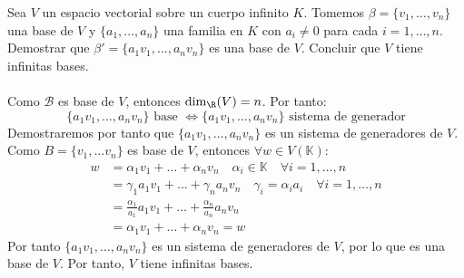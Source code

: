 \begin{ejercicio} Sea \( V \) un espacio vectorial sobre un cuerpo infinito \( K \). Tomemos \( \beta = \{v_1, \ldots, v_n\} \) una base de \( V \) y \( \{a_1, \ldots, a_n\} \) una familia en \( K \) con \( a_i \neq 0 \) para cada \( i = 1, \ldots, n \). Demostrar que \( \beta' = \{a_1v_1, \ldots, a_nv_n\} \) es una base de \( V \). Concluir que \( V \) tiene infinitas bases.
    \\ \\Como $\mathcal{B}$ es base de $V$, entonces $\dim_\R (V) = n$. Por tanto:
    \begin{equation*}
        \{a_1 v_1, \ldots, a_n v_n\} \text{ base } \Leftrightarrow \{a_1 v_1, \ldots, a_n v_n\} \text{ sistema de generador}
    \end{equation*}
    Demostraremos por tanto que $\{a_1 v_1, \ldots, a_n v_n\}$ es un sistema de generadores de $V$. Como
    $B = \{ v_1, \ldots v_n \}$ es base de $V$, entonces $\forall w \in V(\mathbb{K})$:
    \begin{align*}  
        w &= \alpha_1 v_1 + \ldots + \alpha_n v_n \quad \alpha_i \in \mathbb{K} \quad \forall i = 1, \ldots, n \\
        &= \gamma_1 a_1 v_1 + \ldots + \gamma_n a_n v_n \quad \gamma_i = \alpha_i a_i \quad \forall i = 1, \ldots, n \\
        &= \frac{\alpha_1}{a_1} a_1 v_1 + \ldots + \frac{\alpha_n}{a_n} a_n v_n \\
        &= \alpha_1 v_1 + \ldots + \alpha_n v_n = w
    \end{align*}
    Por tanto $\{a_1 v_1, \ldots, a_n v_n\}$ es un sistema de generadores de $V$, por lo que es una base de $V$. Por tanto, $V$ tiene infinitas bases.
\end{ejercicio}


